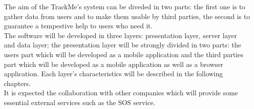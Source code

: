 The aim of the TrackMe's system can be diveded in two parts: the first one is to gather data from users and to make them usable by third parties, the second is to guarantee a tempestive help to users who need it.\\
The software will be developed in three layers: presentation layer, server layer and data layer; the presentation layer will be strongly divided in two parts: the users part which will be developed as a mobile application and the third parties part which will be developed as a mobile application as well as a browser application. Each layer's characteristics will be described in the following chapters. \\It is expected the collaboration with other companies which will provide some essential external services such as the SOS service.